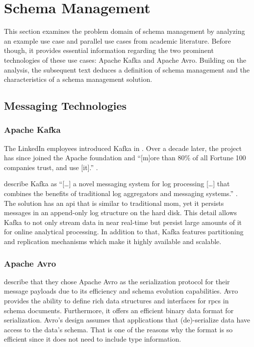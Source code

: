 
\section{Schema Management}\label{sec:schema-management}

This section examines the problem domain of schema management by analyzing an example use case and parallel use cases from academic literature.
Before though, it provides essential information regarding the two prominent technologies of these use cases: Apache Kafka and Apache Avro.
Building on the analysis, the subsequent text deduces a definition of schema management and the characteristics of a schema management solution.

\subsection{Messaging Technologies}

\subsubsection{Apache Kafka}

The LinkedIn employees \citeauthor{kreps_kafka_2011} introduced Kafka in \citeyear{kreps_kafka_2011}.
Over a decade later, the project has since joined the Apache foundation and \enquote{[m]ore than 80\% of all Fortune 100 companies trust, and use [it].} \parencite{noauthor_apache_nodate}.

\citeauthor{kreps_kafka_2011} describe Kafka as \enquote{[\ldots] a novel messaging system for log processing [\ldots] that combines the benefits of traditional log aggregators and messaging systems.} \parencite{kreps_kafka_2011}.
The solution has an \gls{api} that is similar to traditional \gls{mom}, yet it persists messages in an append-only log structure on the hard disk.
This detail allows Kafka to not only stream data in near real-time but persist large amounts of it for online analytical processing.
In addition to that, Kafka features partitioning and replication mechanisms which make it highly available and scalable. \parencite{kreps_kafka_2011}

\subsubsection{Apache Avro}

\citeauthor{kreps_kafka_2011} describe that they chose Apache Avro as the serialization protocol for their message payloads due to its efficiency and schema evolution capabilities. 
Avro provides the ability to define rich data structures and interfaces for \glspl{rpc} in schema documents.
Furthermore, it offers an efficient binary data format for serialization.
Avro's design assumes that applications that (de)-serialize data have access to the data's schema.
That is one of the reasons why the format is so efficient since it does not need to include type information.

